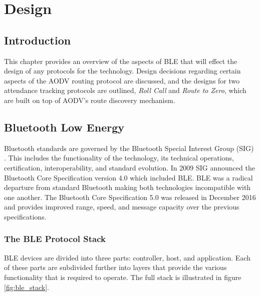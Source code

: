 \chapter{Design}

    \section{Introduction}
    This chapter provides an overview of the aspects of BLE that will effect
    the design of any protocols for the technology. Design decisions
    regarding certain aspects of the AODV routing protocol are discussed, and the
    designs for two attendance tracking protocols are outlined, \textit{Roll Call} and
    \textit{Route to Zero}, which are built on top of AODV's route discovery mechanism.

    \section{Bluetooth Low Energy}
    Bluetooth standards are governed by the Bluetooth Special Interest Group (SIG)
    \cite{SIG}. This includes the functionality of the technology, its technical
    operations, certification, interoperability, and standard evolution. In 2009
    SIG announced the Bluetooth Core Specification version 4.0 which
    included BLE. BLE was a radical departure from standard Bluetooth making
    both technologies incompatible with one another. The Bluetooth Core Specification 5.0 \cite{ble_spec}
    was released in December 2016 and provides improved range, speed, and message
    capacity over the previous specifications.

      \subsection{The BLE Protocol Stack}
    BLE devices are divided into three parts: controller, host, and application.
    Each of these parts are subdivided further into layers that provide the various
    functionality that is required to operate. The full stack is illustrated in
    figure \ref{fig:ble_stack}.

